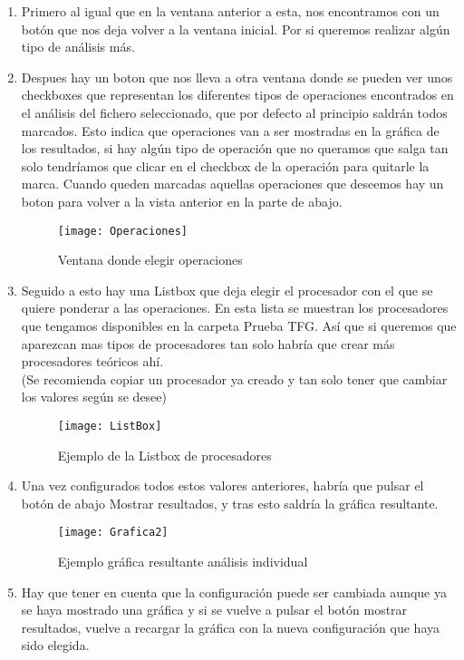 \begin{enumerate}
	\item Primero al igual que en la ventana anterior a esta, nos encontramos con un botón que nos deja volver a la ventana inicial. Por si queremos realizar algún tipo de análisis más.\\

	\item Despues hay un boton que nos lleva a otra ventana donde se pueden ver unos checkboxes que representan los diferentes tipos de operaciones encontrados en el análisis del fichero seleccionado, que por defecto al principio saldrán todos marcados. Esto indica que operaciones van a ser mostradas en la gráfica de los resultados, si hay algún tipo de operación que no queramos que salga tan solo tendríamos que clicar en el checkbox de la operación para quitarle la marca. Cuando queden marcadas aquellas operaciones que deseemos hay un boton para volver a la vista anterior en la parte de abajo.\\

\begin{figure}[H]
\centering
\texttt{[image: Operaciones]}
\caption{Ventana donde elegir operaciones}
\end{figure}

	\item Seguido a esto hay una Listbox que deja elegir el procesador con el que se quiere ponderar a las operaciones. En esta lista se muestran los procesadores que tengamos disponibles en la carpeta Prueba TFG. Así que si queremos que aparezcan mas tipos de procesadores tan solo habría que crear más procesadores teóricos ahí.\\

(Se recomienda copiar un procesador ya creado y tan solo tener que cambiar los valores según se desee)\\

\begin{figure}[H]
\centering
\texttt{[image: ListBox]}
\caption{Ejemplo de la Listbox de procesadores}
\end{figure}

	\item Una vez configurados todos estos valores anteriores, habría que pulsar el botón de abajo Mostrar resultados, y tras esto saldría la gráfica resultante.\\
\begin{figure}[H]
\centering
\texttt{[image: Grafica2]}
\caption{Ejemplo gráfica resultante análisis individual}
\end{figure}
	\item Hay que tener en cuenta que la configuración puede ser cambiada aunque ya se haya mostrado una gráfica y si se vuelve a pulsar el botón mostrar resultados, vuelve a recargar la gráfica con la nueva configuración que haya sido elegida.\\


\end{enumerate}
